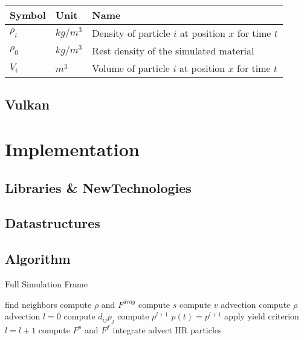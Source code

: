 \documentclass[intern]{cgMA}
\begin{document}
    \begin{center} 
        \begin{tabular}{|l|l|l|}
        \hline
        Symbol & Unit & Name \\
        \hline
        $\rho_i$ & $kg/m^3$ & Density of particle $i$ at position $x$ for time $t$ \\
        $\rho_0$ & $kg/m^3$ & Rest density of the simulated material \\
        $V_i$ & $m^3$ & Volume of particle $i$ at position $x$ for time $t$ \\
        \hline
        
        \end{tabular}
    \end{center}
    
    \subsection{Vulkan}
    
    \section{Implementation}
    
    \subsection{Libraries \& NewTechnologies}
    
    \subsection{Datastructures}
    
    \subsection{Algorithm}
    \begin{algorithm}
        \caption{Full Simulation Frame}
        \begin{algorithmic}[1]
        \State find neighbors 
        \State compute $\rho$ and $F^{drag}$ 
        \State compute $s$ 
        \State compute $v$ advection 
        \State compute $\rho$ advection 
        \State $l = 0$
            \State compute $d_{ij}p_{j}$
            \State compute $p^{l+1}$
            \State $p(t) = p^{l+1}$
            \State apply yield criterion 
            \State $l = l+1$
        \EndWhile
        \State compute $F^p$ and $F^f$ 
        \State integrate 
        \State advect HR particles 
        \end{algorithmic}
    \end{algorithm}
    
\end{document}

